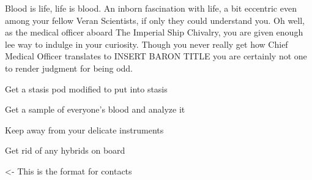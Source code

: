 \documentclass[char]{guildcamp4}
\begin{document}
\name{\cVthree{}}

Blood is life, life is blood.
An inborn fascination with life, a bit eccentric even among your fellow Veran Scientists, if only they could understand you. Oh well, as the 
medical officer aboard The Imperial Ship Chivalry, you are given enough lee way to indulge in your curiosity. Though you never really get how 
Chief Medical Officer translates to INSERT BARON TITLE you are certainly not one to render judgment for being odd.


\begin{itemz}[Goals]
	\item Get a stasis pod modified to put \cPlead{} into stasis
	\item Get a sample of everyone's blood and analyze it
	\item Keep \cJames{} away from your delicate instruments
	\item Get rid of any hybrids on board
\end{itemz}

\begin{itemz}[Notes]
	\item 
\end{itemz}

\begin{contacts}
	\contact{\cVone{}} <- This is the format for contacts 
	\contact{\cVtwo{}}
	\contact{\cJoan{}}
	\contact{\cJulie{}}
	\contact{\cJames{}}
	\contact{\cRasputin{}}
	\contact{\cSpite{}}
	\contact{\cPlead{}}
\end{contacts}
\end{document}
